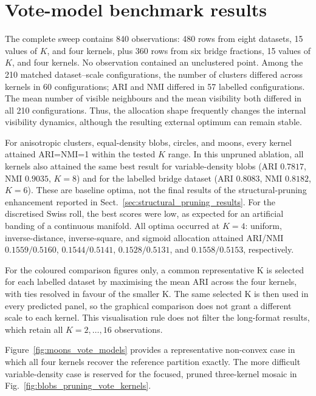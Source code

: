 \documentclass[pdflatex,sn-mathphys-num]{sn-jnl}
\begin{document}
\section{Vote-model benchmark results}\label{sec:vote_results}

The complete sweep contains 840 observations: 480 rows from eight datasets, 15 values of $K$, and four kernels, plus 360 rows from six bridge fractions, 15 values of $K$, and four kernels. No observation contained an unclustered point. Among the 210 matched dataset--scale configurations, the number of clusters differed across kernels in 60 configurations; ARI and NMI differed in 57 labelled configurations. The mean number of visible neighbours and the mean visibility both differed in all 210 configurations. Thus, the allocation shape frequently changes the internal visibility dynamics, although the resulting external optimum can remain stable.

For anisotropic clusters, equal-density blobs, circles, and moons, every kernel attained ARI=NMI=1 within the tested $K$ range. In this unpruned ablation, all kernels also attained the same best result for variable-density blobs (ARI $0.7817$, NMI $0.9035$, $K=8$) and for the labelled bridge dataset (ARI $0.8083$, NMI $0.8182$, $K=6$). These are baseline optima, not the final results of the structural-pruning enhancement reported in Sect.~\ref{sec:structural_pruning_results}. For the discretised Swiss roll, the best scores were low, as expected for an artificial banding of a continuous manifold.  All optima occurred at $K=4$: uniform, inverse-distance, inverse-square, and sigmoid allocation attained ARI/NMI $0.1559/0.5160$, $0.1544/0.5141$, $0.1528/0.5131$, and $0.1558/0.5153$, respectively.

For the coloured comparison figures only, a common representative K is selected
for each labelled dataset by maximising the mean ARI across the four kernels,
with ties resolved in favour of the smaller K.  The same selected K is then
used in every predicted panel, so the graphical comparison does not grant a
different scale to each kernel.  This visualisation rule does not filter the
long-format results, which retain all $K=2,\ldots,16$ observations.

Figure~\ref{fig:moons_vote_models} provides a representative non-convex case in
which all four kernels recover the reference partition exactly.  The more
difficult variable-density case is reserved for the focused, pruned
three-kernel mosaic in Fig.~\ref{fig:blobs_pruning_vote_kernels}.
\end{document}

